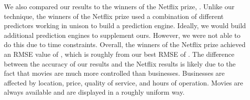 We also compared our results to the winners of the Netflix prize,
\cite{netprize}. Unlike our technique, the winners of the Netflix prize used a
combination of different predictors working in unison to build a prediction
engine. Ideally, we would build additional prediction engines to supplement
ours. However, we were not able to do this due to time constraints. Overall,
the winners of the Netflix prize achieved an RMSE value of \bestNetflixRMSE,
which is roughly \netDiff from our best RMSE of \bestRMSE. The difference
between the accuracy of our results and the Netflix results is likely due to
the fact that movies are much more controlled than businesses. Businesses are
affected by location, price, quality of service, and hours of operation. Movies
are always available and are displayed in a roughly uniform way. 


